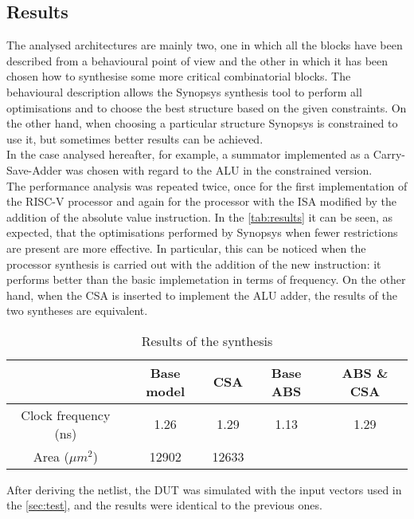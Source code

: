 \subsection{Results}
The analysed architectures are mainly two, one in which all the blocks have been described from a behavioural point of view and the other in which it has been chosen how to synthesise some more critical combinatorial blocks. The behavioural description allows the Synopsys synthesis tool to perform all optimisations and to choose the best structure based on the given constraints. On the other hand, when choosing a particular structure Synopsys is constrained to use it, but sometimes better results can be achieved.\\
In the case analysed hereafter, for example, a summator implemented as a Carry-Save-Adder was chosen with regard to the ALU in the constrained version.\\
The performance analysis was repeated twice, once for the first implementation of the RISC-V processor and again for the processor with the ISA modified by the addition of the absolute value instruction. In the \autoref{tab:results} it can be seen, as expected, that the optimisations performed by Synopsys when fewer restrictions are present are more effective. In particular, this can be noticed when the processor synthesis is carried out with the addition of the new instruction: it performs better than the basic implemetation in terms of frequency. On the other hand, when the CSA is inserted to implement the ALU adder, the results of the two syntheses are equivalent.\\
\begin{table}[H]
	\centering
	\begin{tabular}{c|c|c||c|c}
		& Base model & CSA & Base ABS & ABS  \& CSA \\
		\hline
		Clock frequency (ns) & 1.26 & 1.29 & 1.13 & 1.29 \\
		Area ($\mu m^2$)	& 12902 & 12633 & \\
	\end{tabular}
	\caption{Results of the synthesis}
	\label{tab:results}
\end{table}

\noindent After deriving the netlist, the DUT was simulated with the input vectors used in the \autoref{sec:test}, and the results were identical to the previous ones. 